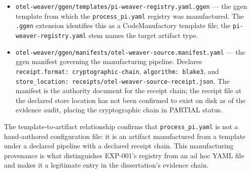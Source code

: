 \begin{itemize}
  \item \texttt{otel-weaver/ggen/templates/pi-weaver-registry.yaml.ggen} --- the ggen template
        from which the \texttt{process\_pi.yaml} registry was manufactured. The \texttt{.ggen}
        extension identifies this as a CodeManufactory template file; the \texttt{pi-weaver-registry.yaml}
        stem names the target artifact type.
  \item \texttt{otel-weaver/ggen/manifests/otel-weaver-source.manifest.yaml} --- the ggen
        manifest governing the manufacturing pipeline. Declares \texttt{receipt.format: cryptographic-chain},
        \texttt{algorithm: blake3}, and \texttt{store\_location: receipts/otel-weaver-source-receipt.json}.
        The manifest is the authority document for the receipt chain; the receipt file at the
        declared store location has not been confirmed to exist on disk as of the evidence audit,
        placing the cryptographic chain in PARTIAL status.
\end{itemize}

The template-to-artifact relationship confirms that \texttt{process\_pi.yaml} is not a
hand-authored configuration file: it is an artifact manufactured from a template under a declared
pipeline with a declared receipt chain. This manufacturing provenance is what distinguishes
EXP-001's registry from an ad hoc YAML file and makes it a legitimate entry in the dissertation's
evidence chain.
